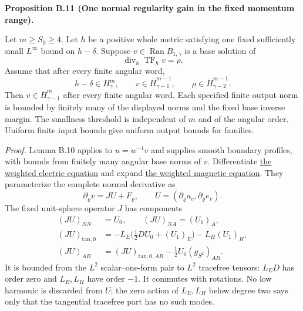 \documentclass[
  english,
  11pt,
  reqno]{amsart}
\makeatletter
\newcommand{\pandocstatementheading}[1]{%
  \par\if@nobreak\else
    \addpenalty{\@beginparpenalty}%
    \addvspace{.5\baselineskip plus .2\baselineskip minus .2\baselineskip}%
  \fi
  {\normalfont\bfseries #1\par}%
  \nobreak\@afterindenttrue\@afterheading
}
\makeatother
\begin{document}
\pandocstatementheading{\leavevmode{}\label{prop:online-momentum-one-normal-gain}Proposition B.11 (One normal regularity gain in the fixed momentum
range).}

Let \(m\ge S_0\ge4\). Let \(h\) be a positive whole metric satisfying
one fixed sufficiently small \(L^\infty\) bound on \(h-\delta\). Suppose
\(v\in\operatorname{Ran}B_{1,\gamma}\) is a base solution of%
 \[
\operatorname{div}_h\operatorname{TF}_h v=\rho.
\] Assume that after every finite angular word,%
 \[
h-\delta\in H^m_\gamma,\qquad
v\in\overline H^{m-1}_{\gamma-1},\qquad
\rho\in\overline H^{m-1}_{\gamma-2}.
\] Then \(v\in\overline H^m_{\gamma-1}\) after every finite angular
word. Each specified finite output norm is bounded by finitely many of
the displayed norms and the fixed base inverse margin. The smallness
threshold is independent of \(m\) and of the angular order. Uniform
finite input bounds give uniform output bounds for families.

\emph{Proof.} Lemma B.10 applies to \(u=w^{-1}v\) and supplies smooth
boundary profiles, with bounds from finitely many angular base norms of
\(v\). Differentiate \hyperref[eq:online-momentum-weighted-electric]{the
weighted electric equation} and expand
\hyperref[eq:online-momentum-weighted-magnetic]{the weighted magnetic
equation}. They parameterize the complete normal derivative as%
 \[
\partial_\varrho v=JU+F_\varrho,
\qquad U=(\partial_\varrho a_v,\partial_\varrho e_v).
\] The fixed unit-sphere operator \(J\) has components%
 \[
\begin{aligned}
(JU)_{NN}&=U_0,\qquad (JU)_{NA}=(U_1)_A,\\
(JU)_{\mathrm{tan},0}
 &=-L_E\bigl(\tfrac12DU_0+(U_1)_E\bigr)-L_H(U_1)_H,\\
(JU)_{AB}
 &=(JU)_{\mathrm{tan},0,AB}-\tfrac12U_0(g_{S^2})_{AB}.
\end{aligned}
\] It is bounded from the \(L^2\) scalar--one-form pair to \(L^2\)
tracefree tensors: \(L_ED\) has order zero and \(L_E,L_H\) have order
\(-1\). It commutes with rotations. No low harmonic is discarded from
\(U\); the zero action of \(L_E,L_H\) below degree two says only that
the tangential tracefree part has no such modes.
\end{document}
